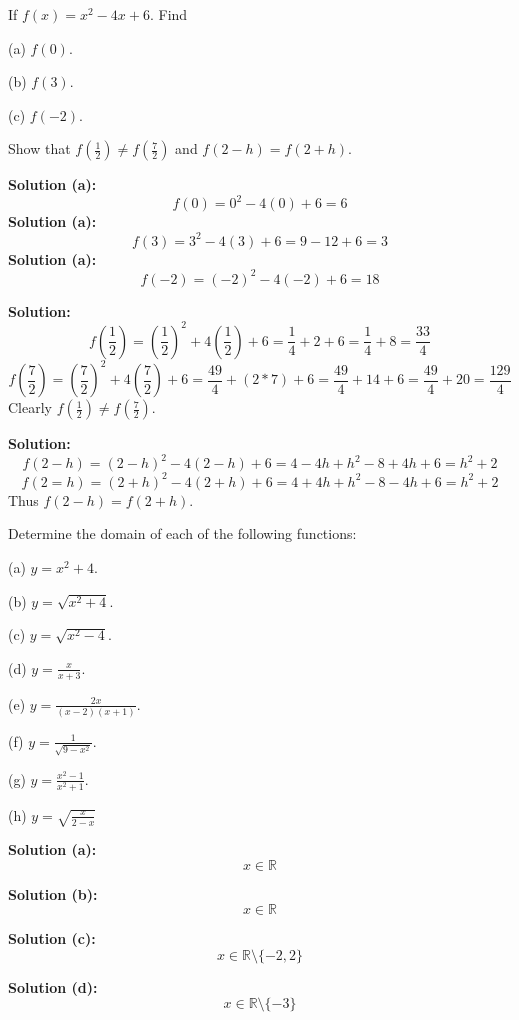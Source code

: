 \begin{tcolorbox}[title=Problem 1, breakable]
    If $f(x) = x^2 - 4x + 6$. Find 

    (a) $f(0)$.

    (b) $f(3)$.

    (c) $f(-2)$.

    Show that $f(\frac{1}{2}) \ne f(\frac{7}{2})$ 
        and $f(2 - h) = f(2 + h)$.
\end{tcolorbox}

\textbf{Solution (a):}
\[f(0) = 0^2 - 4(0) + 6 = 6\]
\textbf{Solution (a):}
\[f(3) = 3^2 - 4(3) + 6 = 9 - 12 + 6 = 3\]
\textbf{Solution (a):}
\[f(-2) = (-2)^2 - 4(-2) + 6 = 18\]

\textbf{Solution:}
\[f(\frac{1}{2}) 
    = (\frac{1}{2})^2 + 4(\frac{1}{2}) + 6 
    = \frac{1}{4} + 2 + 6
    = \frac{1}{4} + 8
    = \frac{33}{4}\]
\[f(\frac{7}{2}) 
    = (\frac{7}{2})^2 + 4(\frac{7}{2}) + 6
    = \frac{49}{4} + (2 * 7) + 6
    = \frac{49}{4} + 14 + 6
    = \frac{49}{4} + 20
    = \frac{129}{4}\]
Clearly $f(\frac{1}{2}) \ne f(\frac{7}{2})$.

\textbf{Solution:}
\[f(2 - h) 
    = (2 - h)^2 - 4(2 - h) + 6
    = 4 - 4h + h^2 - 8 + 4h + 6
    = h^2 + 2\]
\[f(2 = h)
    = (2 + h)^2 - 4(2 + h) + 6
    = 4 + 4h + h^2 - 8 - 4h + 6
    = h^2 + 2\]
Thus $f(2 - h) = f(2 + h)$.

\begin{tcolorbox}[title=Problem 16, breakable]
    Determine the domain of each of the following functions:

    (a) $y = x^2 + 4$.

    (b) $y = \sqrt{x^2 + 4}$.

    (c) $y = \sqrt{x^2 - 4}$.

    (d) $y = \frac{x}{x + 3}$.

    (e) $y = \frac{2x}{(x - 2)(x + 1)}$.

    (f) $y = \frac{1}{\sqrt{9 - x^2}}$.

    (g) $y = \frac{x^2 - 1}{x^2 + 1}$.

    (h) $y = \sqrt{\frac{x}{2 - x}}$
\end{tcolorbox}

\textbf{Solution (a):}
\[x \in \mathbb{R}\]

\textbf{Solution (b):}
\[x \in \mathbb{R}\]

\textbf{Solution (c):}
\[x \in \mathbb{R} \setminus \{-2, 2\}\]

\textbf{Solution (d):}
\[x \in \mathbb{R} \setminus \{-3\}\]

